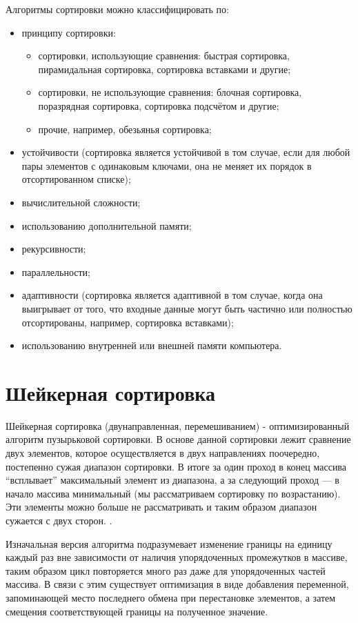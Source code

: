 \documentclass[a4paper,oneside,14pt]{extreport}
\begin{document}
Алгоритмы сортировки можно классифицировать по:
\begin{itemize}
	\item принципу сортировки:
	\begin{itemize}
		\item сортировки, использующие сравнения: быстрая сортировка, пирамидальная сортировка, сортировка вставками и другие;
		\item сортировки, не использующие сравнения: блочная сортировка, поразрядная сортировка, сортировка подсчётом и другие;
		\item прочие, например, обезьянья сортировка;
	\end{itemize}
	\item устойчивости (сортировка является устойчивой в том случае, если для любой пары элементов с одинаковым ключами, она не меняет их порядок в отсортированном списке);
	\item вычислительной сложности;
	\item использованию дополнительной памяти;
	\item рекурсивности;
	\item параллельности;
	\item адаптивности (сортировка является адаптивной в том случае, когда она выигрывает от того, что входные данные могут быть частично или полностью отсортированы, например, сортировка вставками);
	\item использованию внутренней или внешней памяти компьютера. 
\end{itemize}

\section{Шейкерная сортировка}
Шейкерная сортировка (двунаправленная, перемешиванием) - оптимизированный алгоритм пузырьковой сортировки. В основе данной сортировки лежит сравнение двух элементов, которое осуществляется в двух направлениях поочередно, постепенно сужая диапазон сортировки. В итоге за один проход в конец массива “всплывает” максимальный элемент из диапазона, а за следующий проход — в начало массива минимальный (мы рассматриваем сортировку по возрастанию). Эти элементы можно больше не рассматривать и таким образом диапазон сужается с двух сторон. \cite{Shaker}.

Изначальная версия алгоритма подразумевает изменение границы на единицу каждый раз вне зависимости от наличия упорядоченных промежутков в массиве, таким образом цикл повторяется много раз даже для упорядоченных частей массива. В связи с этим существует оптимизация в виде добавления переменной, запоминающей место последнего обмена при перестановке элементов, а затем смещения соответствующей границы на полученное значение.
\end{document}
